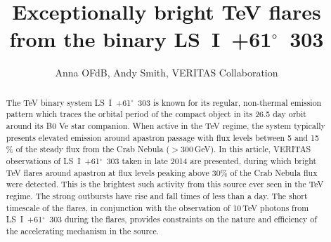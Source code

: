 \documentclass[preprint2]{aastex}
\newcommand{\lsi}{LS~I~+61$^{\circ}$~303}
\newcommand{\gev}{\,GeV}
\newcommand{\tev}{\,TeV}
\begin{document}

\title{Exceptionally bright TeV flares from the binary \lsi{}}


\author{
Anna OFdB,
Andy Smith,
VERITAS Collaboration
}




\begin{abstract}
The TeV binary system \lsi{} is known for its regular, non-thermal emission pattern which traces the orbital period of the compact object in its 26.5 day orbit around its B0 Ve star companion. When active in the TeV regime, the system typically presents elevated emission around apastron passage with flux levels between 5 and 15\,\% of the steady flux from the Crab Nebula ($>300$\gev{}). In this article, VERITAS observations of \lsi{} taken in late 2014 are presented, during which bright TeV flares around apastron at flux levels peaking above $30\%$ of the Crab Nebula flux were detected. This is the brightest such activity from this source ever seen in the TeV regime. The strong outbursts have rise and fall times of less than a day. The short timescale of the flares, in conjunction with the observation of 10\tev{} photons from \lsi{} during the flares, provides constraints on the nature and efficiency of the accelerating mechanism in the source.
\end{abstract}
\end{document}
